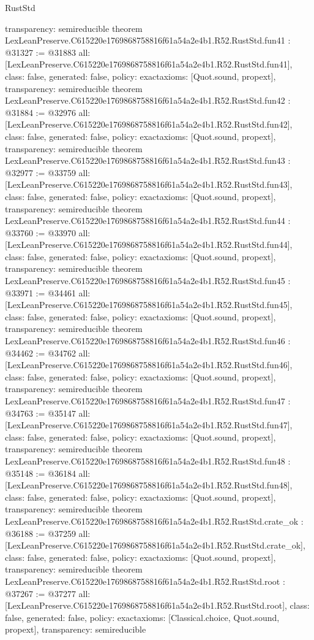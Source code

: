 \begin{lexlean}{RustStd}
\begin{coremodule}
{  transparency: semireducible
}
theorem LexLeanPreserve.C615220e1769868758816f61a54a2e4b1.R52.RustStd.fun41 : @31327 := @31883 {
  all: [LexLeanPreserve.C615220e1769868758816f61a54a2e4b1.R52.RustStd.fun41],
  class: false,
  generated: false,
  policy: exact{axioms: [Quot.sound, propext]},
  transparency: semireducible
}
theorem LexLeanPreserve.C615220e1769868758816f61a54a2e4b1.R52.RustStd.fun42 : @31884 := @32976 {
  all: [LexLeanPreserve.C615220e1769868758816f61a54a2e4b1.R52.RustStd.fun42],
  class: false,
  generated: false,
  policy: exact{axioms: [Quot.sound, propext]},
  transparency: semireducible
}
theorem LexLeanPreserve.C615220e1769868758816f61a54a2e4b1.R52.RustStd.fun43 : @32977 := @33759 {
  all: [LexLeanPreserve.C615220e1769868758816f61a54a2e4b1.R52.RustStd.fun43],
  class: false,
  generated: false,
  policy: exact{axioms: [Quot.sound, propext]},
  transparency: semireducible
}
theorem LexLeanPreserve.C615220e1769868758816f61a54a2e4b1.R52.RustStd.fun44 : @33760 := @33970 {
  all: [LexLeanPreserve.C615220e1769868758816f61a54a2e4b1.R52.RustStd.fun44],
  class: false,
  generated: false,
  policy: exact{axioms: [Quot.sound, propext]},
  transparency: semireducible
}
theorem LexLeanPreserve.C615220e1769868758816f61a54a2e4b1.R52.RustStd.fun45 : @33971 := @34461 {
  all: [LexLeanPreserve.C615220e1769868758816f61a54a2e4b1.R52.RustStd.fun45],
  class: false,
  generated: false,
  policy: exact{axioms: [Quot.sound, propext]},
  transparency: semireducible
}
theorem LexLeanPreserve.C615220e1769868758816f61a54a2e4b1.R52.RustStd.fun46 : @34462 := @34762 {
  all: [LexLeanPreserve.C615220e1769868758816f61a54a2e4b1.R52.RustStd.fun46],
  class: false,
  generated: false,
  policy: exact{axioms: [Quot.sound, propext]},
  transparency: semireducible
}
theorem LexLeanPreserve.C615220e1769868758816f61a54a2e4b1.R52.RustStd.fun47 : @34763 := @35147 {
  all: [LexLeanPreserve.C615220e1769868758816f61a54a2e4b1.R52.RustStd.fun47],
  class: false,
  generated: false,
  policy: exact{axioms: [Quot.sound, propext]},
  transparency: semireducible
}
theorem LexLeanPreserve.C615220e1769868758816f61a54a2e4b1.R52.RustStd.fun48 : @35148 := @36184 {
  all: [LexLeanPreserve.C615220e1769868758816f61a54a2e4b1.R52.RustStd.fun48],
  class: false,
  generated: false,
  policy: exact{axioms: [Quot.sound, propext]},
  transparency: semireducible
}
theorem LexLeanPreserve.C615220e1769868758816f61a54a2e4b1.R52.RustStd.crate_ok : @36188 := @37259 {
  all: [LexLeanPreserve.C615220e1769868758816f61a54a2e4b1.R52.RustStd.crate_ok],
  class: false,
  generated: false,
  policy: exact{axioms: [Quot.sound, propext]},
  transparency: semireducible
}
theorem LexLeanPreserve.C615220e1769868758816f61a54a2e4b1.R52.RustStd.root : @37267 := @37277 {
  all: [LexLeanPreserve.C615220e1769868758816f61a54a2e4b1.R52.RustStd.root],
  class: false,
  generated: false,
  policy: exact{axioms: [Classical.choice, Quot.sound, propext]},
  transparency: semireducible
}


\end{coremodule}
\end{lexlean}
